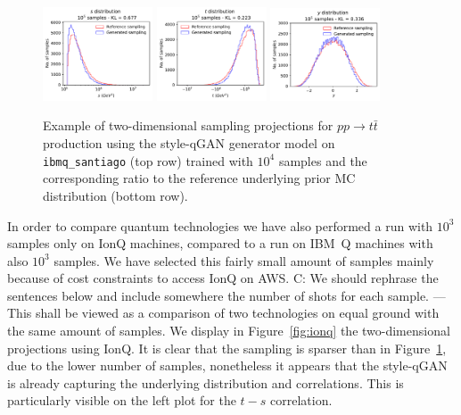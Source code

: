 \documentclass[twocolumn,preprintnumbers,superscriptaddress]{revtex4-2}
\begin{document}
\begin{figure}
  \includegraphics[width=0.29\textwidth]{plots/hardware/ibm_santiago/s-distribution_IBM_LHCdata_100k.pdf}%
  \includegraphics[width=0.29\textwidth]{plots/hardware/ibm_santiago/t-distribution_IBM_LHCdata_100k.pdf}%
  \includegraphics[width=0.29\textwidth]{plots/hardware/ibm_santiago/y-distribution_IBM_LHCdata_100k.pdf}

  \caption{\label{fig:ibm}Example of two-dimensional sampling projections for
  $pp \rightarrow t\bar{t}$ production using the style-qGAN generator
  model on {\tt ibmq\_santiago} (top row) trained with $10^4$ samples and
  the corresponding ratio to the reference underlying prior MC
  distribution (bottom row).}
\end{figure}


In order to compare quantum technologies we have also performed a run
with $10^3$ samples only on IonQ machines, compared to a run on IBM~Q
machines with also $10^3$ samples. We have selected this fairly small
amount of samples mainly because of cost constraints to access IonQ on
AWS. {\color{red} C: We should rephrase the sentences below and include somewhere the number of shots for each sample. --- This shall be viewed as a comparison of two technologies on equal
ground with the same amount of samples. We display in
Figure~\ref{fig:ionq} the two-dimensional projections using IonQ. It
is clear that the sampling is sparser than in Figure~\ref{fig:ibm},
due to the lower number of samples, nonetheless it appears that the
style-qGAN is already capturing the underlying distribution and
correlations. This is particularly visible on the left plot for the
$t-s$ correlation.}
\end{document}
